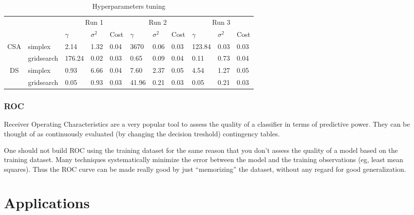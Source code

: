 \documentclass[11pt, a4paper]{article}
\begin{document}
\begin{table}[H]
  \centering
  \begin{tabular}{cl|l|l|l|l|l|l|l|l|l|}
    \cline{3-11}
    \multicolumn{1}{l}{}                       &            & \multicolumn{3}{c|}{Run 1}   & \multicolumn{3}{c|}{Run 2}   & \multicolumn{3}{c|}{Run 3}   \\ \cline{3-11} 
    \multicolumn{1}{l}{}                       &            & $\gamma$ & $\sigma^2$ & Cost & $\gamma$ & $\sigma^2$ & Cost & $\gamma$ & $\sigma^2$ & Cost \\ \hline
    \multicolumn{1}{|c|}{\multirow{2}{*}{CSA}} & simplex    & 2.14     & 1.32       & 0.04 & 3670     & 0.06       & 0.03 & 123.84   & 0.03       & 0.03 \\ \cline{2-11} 
    \multicolumn{1}{|c|}{}                     & gridsearch & 176.24   & 0.02       & 0.03 & 0.65     & 0.09       & 0.04 & 0.11     & 0.73       & 0.04 \\ \hline
    \multicolumn{1}{|c|}{\multirow{2}{*}{DS}}  & simplex    & 0.93     & 6.66       & 0.04 & 7.60     & 2.37       & 0.05 & 4.54     & 1.27       & 0.05 \\ \cline{2-11} 
    \multicolumn{1}{|c|}{}                     & gridsearch & 0.05     & 0.93       & 0.03 & 41.96    & 0.21       & 0.03 & 0.05     & 0.21       & 0.03 \\ \hline
  \end{tabular}
  \caption{Hyperparameters tuning}
  \label{table:hyperparamstuning}
\end{table}

\subsubsection{ROC}

Receiver Operating Characteristics are a very popular tool to assess
the quality of a classifier in terms of predictive power. They can be
thought of as continuously evaluated (by changing the decision
treshold) contingency tables. 

One should not build ROC using the training dataset for the same
reason that you don't assess the quality of a model based on the
training dataset. Many techniques systematically minimize the error
between the model and the training observations (eg, least mean
squares). Thus the ROC curve can be made really good by just
``memorizing'' the dataset, without any regard for good
generalization.

\section{Applications} 
\end{document}
